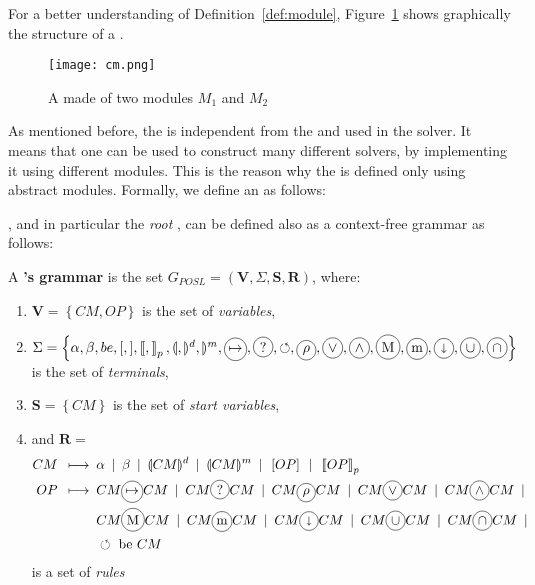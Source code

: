 For a better understanding of Definition~\ref{def:module}, Figure~\ref{fig:cm} shows graphically  the structure of a \cm.

\begin{figure}[h]
	\centering
	\texttt{[image: cm.png]}
	\caption[]{A \cm{} made of two modules $M_1$ and $M_2$}
	\label{fig:cm}
\end{figure}

As mentioned before, the \as{} is independent from the \oms{} and \opchs{} used in the solver. It means that one \as{} can be used to construct many different solvers, by implementing it using different modules. %
This is the reason why the \as{} is defined only using {abstract} modules. Formally, we define an \as{} as follows:


\Cms{}, and in particular the \textit{root} \cm{}, can be defined also as a context-free grammar as follows:

\begin{definition}\label{def:grammar} A {\bf \cm{}'s grammar} is the set $G_{POSL} = \left(\mathbf{V},\Sigma, \mathbf{S}, \mathbf{R}\right)$, where:
\begin{enumerate}\renewcommand{\labelitemi}{\scriptsize$\blacksquare$}
	\item $\mathbf{V} = \left\{CM, OP\right\}$ is the set of {\it variables},
	\item $\Sigma = \left\{\alpha, \beta, be, [, ], \lbk, \rbk_p, \lsendpar, \rsenddatapar, \rsendmodulepar, \circled{$\mapsto$},\circled{?},\circlearrowleft, \circled{$\rho$}, \circled{$\vee$}, \circled{$\wedge$}, \circled{M}, \circled{m}, \circled{$\shortdownarrow$}, \circled{$\cup$}, \circled{$\cap$}\right\}$ is the set of {\it terminals},
	\item $\mathbf{S} = \left\{CM\right\}$ is the set of {\it start variables},
	\item and $\mathbf{R} = $
		\begin{align*} 
		CM \produce & \alpha \OR \beta \OR \senddataop{CM} \OR \sendmoduleop{CM} \OR \left[OP\right] \OR \lbk OP\rbk_p\\
		OP \produce & CM \circled{$\mapsto$} CM \OR CM \circled{?} CM \OR CM \circled{$\rho$} CM \OR CM \circled{$\vee$} CM \OR CM \circled{$\wedge$} CM  \OR\\
		& CM \circled{M} CM \OR CM \circled{m} CM \OR CM \circled{$\shortdownarrow$} CM \OR CM \circled{$\cup$} CM \OR CM \circled{$\cap$} CM  \OR\\
		& \circlearrowleft \text{ be } CM%
		\end{align*} is a set of {\it rules}
\end{enumerate} 
\end{definition}

